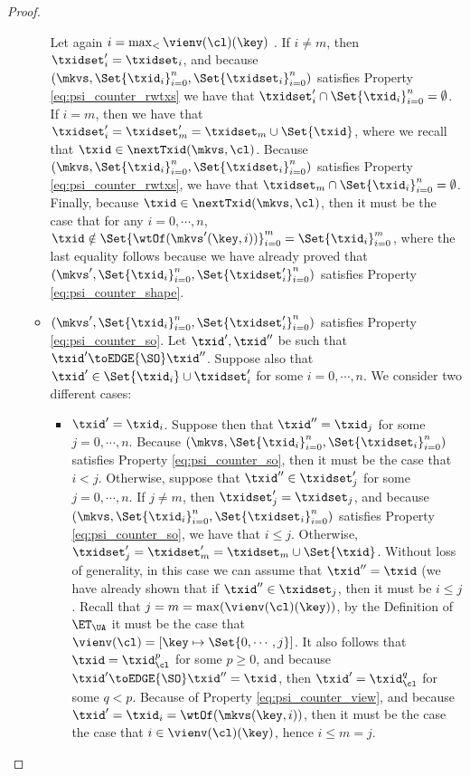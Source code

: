 \begin{proof}
\begin{itemize}
\begin{itemize}
Let again $i = \max_{<}\vienv(\cl)(\key)$ . 
If $i \neq m$, then $\txidset'_{i} = \txidset_{i}$, and because $(\mkvs,  \Set{\txid_{i}}_{i=0}^{n}, \Set{\txidset_{i}}_{i=0}^{n})$ 
satisfies Property \eqref{eq:psi_counter_rwtxs} 
we have that $\txidset'_{i} \cap \Set{\txid_{i}}_{i=0}^{n} = \emptyset$. If $i = m$, then 
we have that $\txidset'_{i} = \txidset'_{m} = \txidset_{m} \cup \Set{\txid}$, where we recall that $\txid \in \nextTxid(\mkvs, \cl)$. 
Because $(\mkvs,  \Set{\txid_{i}}_{i=0}^{n}, \Set{\txidset_{i}}_{i=0}^{n})$ 
satisfies Property \eqref{eq:psi_counter_rwtxs}, we have that $\txidset_{m} \cap \Set{\txid_{i}}_{i=0}^{n} 
= \emptyset$. Finally, because $\txid \in \nextTxid(\mkvs,\cl)$, then it must be the case that 
for any $i = 0,\cdots, n$, $\txid \notin \Set{\wtOf(\mkvs'(\key,i))}_{i=0}^{m} = \Set{\txid_{i}}_{i=0}^{m}$,  
where the last equality follows because we have already proved that $(\mkvs',  \Set{\txid_{i}}_{i=0}^{n}, \Set{\txidset'_{i}}_{i=0}^{n})$ 
satisfies Property \eqref{eq:psi_counter_shape}.

\item $(\mkvs',  \Set{\txid_{i}}_{i=0}^{n}, \Set{\txidset'_{i}}_{i=0}^{n})$ satisfies Property \eqref{eq:psi_counter_so}. 
Let $\txid', \txid''$ be such that $\txid' \toEDGE{\SO} \txid''$. 
Suppose also that $\txid' \in \Set{\txid_{i}} \cup \txidset'_{i}$ for some $i = 0,\cdots, n$. We consider two different cases:
\begin{itemize}
\item $\txid' = \txid_{i}$. Suppose then that $\txid'' = \txid_{j}$ for some $j = 0, \cdots, n$. Because 
$(\mkvs,  \Set{\txid_{i}}_{i=0}^{n}, \Set{\txidset_{i}}_{i=0}^{n})$ satisfies Property 
\eqref{eq:psi_counter_so}, then it must be the case that $i < j$. Otherwise, 
suppose that $\txid'' \in \txidset'_{j}$ for some $j=0,\cdots,n$. If $j \neq m$, then $\txidset'_{j} = \txidset_{j}$, 
and because $(\mkvs,  \Set{\txid_{i}}_{i=0}^{n}, \Set{\txidset_{i}}_{i=0}^{n})$ satisfies Property \eqref{eq:psi_counter_so}, we have that $i \leq j$. 
Otherwise, $\txidset'_{j} = \txidset'_{m} =  \txidset_{m} \cup \Set{\txid}$. Without loss of generality, in this case 
we can assume that $\txid'' = \txid$ (we have already shown that if $\txid'' \in \txidset_{j}$, then 
it must be $i \leq j$. Recall that $j = m = \max(\vienv(\cl)(\key))$, by the Definition of 
$\ET_{\UA}$ it must be the case that $\vienv(\cl) = [\key \mapsto \Set{0,\cdots, j}]$. 
It also follows that $\txid = \txid_{\cl}^{p}$ for some $p \geq 0$, and because $\txid' \toEDGE{\SO} \txid'' = \txid$, 
then $\txid' = \txid_{\cl}^{q}$ for some $q < p$. Because of Property 
\eqref{eq:psi_counter_view}, and because $\txid' = \txid_{i} = \wtOf(\mkvs(\key, i))$, then it must be the case the 
case that $i \in \vienv(\cl)(\key)$, hence  $i \leq m = j$.


\end{itemize}
\end{itemize}
\end{itemize}
\end{proof}
